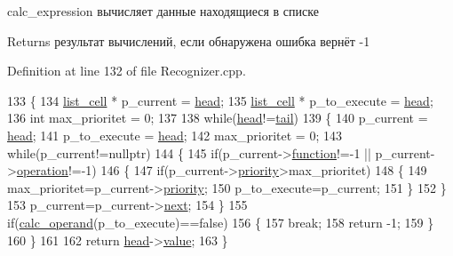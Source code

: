 calc\+\_\+expression вычисляет данные находящиеся в списке 

\begin{DoxyReturn}{Returns}
результат вычислений, если обнаружена ошибка вернёт -\/1 
\end{DoxyReturn}


Definition at line 132 of file Recognizer.\+cpp.


\begin{DoxyCode}
133 \{
134     \hyperlink{structlist__cell}{list\_cell} * p\_current       = \hyperlink{classRecognizer_a57472dc57c50868b264c1aad83499e8c}{head};
135     \hyperlink{structlist__cell}{list\_cell} * p\_to\_execute    = \hyperlink{classRecognizer_a57472dc57c50868b264c1aad83499e8c}{head};
136     \textcolor{keywordtype}{int} max\_prioritet           = 0;
137 
138     \textcolor{keywordflow}{while}(\hyperlink{classRecognizer_a57472dc57c50868b264c1aad83499e8c}{head}!=\hyperlink{classRecognizer_a123b3de09c7231ee0344328732fa5e13}{tail})
139     \{
140         p\_current       = \hyperlink{classRecognizer_a57472dc57c50868b264c1aad83499e8c}{head};
141         p\_to\_execute    = \hyperlink{classRecognizer_a57472dc57c50868b264c1aad83499e8c}{head};
142         max\_prioritet   = 0;
143         \textcolor{keywordflow}{while}(p\_current!=\textcolor{keyword}{nullptr})
144         \{
145             \textcolor{keywordflow}{if}(p\_current->\hyperlink{structlist__cell_a983ddfbf8def7d35bcb3baac813ef99c}{function}!=-1 || p\_current->\hyperlink{structlist__cell_a6ca5af01e34cada2fc702e6b5ab256f2}{operation}!=-1)
146             \{
147                 \textcolor{keywordflow}{if}(p\_current->\hyperlink{structlist__cell_afd51de45bab516a708417ccc2868595c}{priority}>max\_prioritet)
148                 \{
149                     max\_prioritet=p\_current->\hyperlink{structlist__cell_afd51de45bab516a708417ccc2868595c}{priority};
150                     p\_to\_execute=p\_current;
151                 \}
152             \}
153             p\_current=p\_current->\hyperlink{structlist__cell_a09c7a56909013720bcf26fa3208e6aa0}{next};
154         \}
155         \textcolor{keywordflow}{if}(\hyperlink{classRecognizer_afc466411f799b54fc7c3e5c8875d78af}{calc\_operand}(p\_to\_execute)==\textcolor{keyword}{false})
156         \{
157             \textcolor{keywordflow}{break};
158             \textcolor{keywordflow}{return} -1;
159         \}
160     \}
161 
162     \textcolor{keywordflow}{return} \hyperlink{classRecognizer_a57472dc57c50868b264c1aad83499e8c}{head}->\hyperlink{structlist__cell_a5f4d22d779ccc8d4fcf59b2ac35950ec}{value};
163 \}
\end{DoxyCode}
\hypertarget{classRecognizer_afc466411f799b54fc7c3e5c8875d78af}{}
